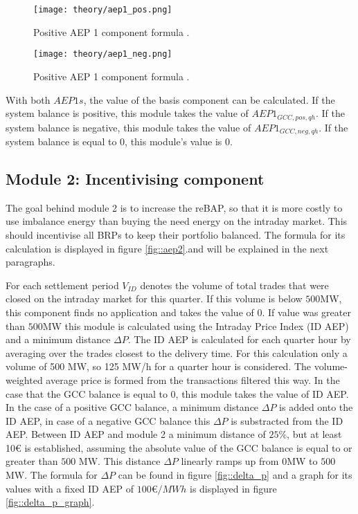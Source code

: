 \documentclass[class=scrbook, crop=false]{standalone}
\begin{document}
\begin{figure}[ht]
            \centering
            \texttt{[image: theory/aep1\_pos.png]}
            \caption[Positive AEP 1 component formula]{Positive AEP 1 component formula \cite{NetztransparenzReBAP}.}
            \label{fig::aep1_pos}
 \end{figure}
 
 

 \begin{figure}[ht]
            \centering
            \texttt{[image: theory/aep1\_neg.png]}
             \caption[Positive AEP 1 component formula]{Positive AEP 1 component formula \cite{NetztransparenzReBAP}.}
            \label{fig::aep1_neg}
 \end{figure}

With both $AEP1s$, the value of the basis component can be calculated. If the system balance is positive, this module takes the value of $AEP1_{GCC, pos, qh}$. If the system balance is negative, this module takes the value of $AEP1_{GCC, neg, qh}$. If the system balance is equal to 0, this module's value is 0.

\subsection{Module 2: Incentivising component}
\label{Section::Module_2}
The goal behind module 2 is to increase the reBAP, so that it is more costly to use imbalance energy than buying the need energy on the intraday market. This should incentivise all BRPs to keep their portfolio balanced. 
The formula for its calculation is displayed in figure \ref{fig::aep2}.and will be explained in the next paragraphs.

For each settlement period $V_{ID}$ denotes the volume of total trades that were closed on the intraday market for this quarter. If this volume is below $500$MW, this component finds no application and takes the value of 0. If value was greater than $500$MW this module is calculated using the Intraday Price Index (ID AEP) and a minimum distance $\Delta P$. 
The ID AEP is calculated for each quarter hour by averaging over the trades closest to the delivery time. For this calculation only a volume of 500 MW, so 125 MW/h for a quarter hour is considered.  
The volume-weighted average price is formed from the transactions filtered this way. 
In the case that the GCC balance is equal to 0, this module takes the value of ID AEP.  In the case of a positive GCC balance, a minimum distance $\Delta P$ is added onto the ID AEP, in case of a negative GCC balance this $\Delta P$ is substracted from the ID AEP. Between ID AEP and module 2 a minimum distance of $25\%$, but at least 10€ is established, assuming the absolute value of the GCC balance is equal to or greater than $500$ MW. This distance $\Delta P$ linearly ramps up from $0$MW to $500$MW. The formula for $\Delta P$ can be found in figure \ref{fig::delta_p} and a graph for its values with a fixed ID AEP of $100€/MWh$ is displayed in figure \ref{fig::delta_p_graph}.
\end{document}
